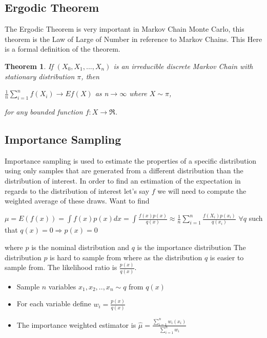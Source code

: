 \documentclass[11pt,a4paper]{article}
\theoremstyle{plain}
\newtheorem{thm}[fact]{Theorem}
\begin{document}
\subsection*{Ergodic Theorem}
The Ergodic Theorem is very important in Markov Chain Monte Carlo, this theorem is the Law of Large of Number in reference to Markov Chains. This  Here is a formal definition of the theorem. 
\begin{thm}
If $(X_0,X_1,...,X_n)$ is an irreducible discrete Markov Chain with stationary distribution $\pi$, then

\begin{center}
$\frac{1}{n} \displaystyle\sum_{i=1}^n f(X_i)\rightarrow Ef(X)$ as n$\rightarrow \infty$ where $X\sim \pi$, 
\end{center}
for any bounded function $f:X\rightarrow \Re$.
\end{thm}

\subsection{\bf Importance Sampling}
Importance sampling is used to estimate the properties of a specific distribution using only samples that are generated from a different distribution than the distribution of interest.  In order to find an estimation of the expectation in regards to the distribution of interest let's say $f$ we will need to compute the weighted average of these draws. Want to find 
\begin{center}
$\mu=E(f(x))=\int f(x)p(x)dx=\displaystyle\int\frac{f(x)p(x)}{q(x)} \approx \frac {1}{n} \displaystyle\sum_{i=1}^n \frac{f(X_i)p(x_i)}{q(x_i)}$  
\newline $\forall q$ such that $q(x)=0 \Rightarrow p(x)=0$ 
\end{center}
where $p$ is the nominal distribution and $q$ is the importance distribution 
\newline The distribution $p$ is hard to sample from where as the distribution $q$  is  easier to sample from. The likelihood ratio is $\frac {p(x)}{q(x)}$.
\begin{itemize}
  \item Sample $n$ variables  $x_1,x_2,..,x_n \sim q$ from $q(x)$
  \item For each variable define $w_i=\frac{p(x)}{q(x)}$
  \item The importance weighted estimator is $\hat{\mu}=\frac{\sum_{i=1}^n w_i(x_i)}{\sum_{i=1}^n w_i}$
\end{itemize}
\end{document}
